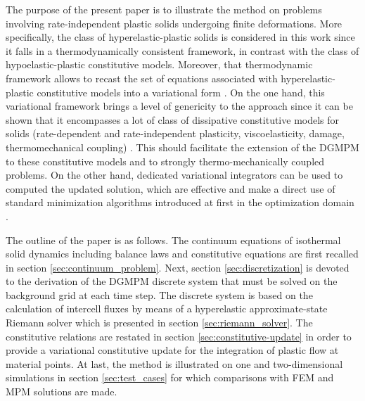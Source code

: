 The purpose of the present paper is to illustrate the method on problems involving rate-independent plastic solids undergoing finite deformations.
More specifically, the class of hyperelastic-plastic solids is considered in this work since it falls in a thermodynamically consistent framework, in contrast with the class of hypoelastic-plastic constitutive models. 
Moreover, that thermodynamic framework allows to recast the set of equations associated with hyperelastic-plastic constitutive models into a variational form \cite{Laurent99}.
On the one hand, this variational framework brings a level of genericity to the approach since it can be shown that it encompasses a lot of class of dissipative constitutive models for solids (rate-dependent and rate-independent plasticity, viscoelasticity, damage, thermomechanical coupling) \cite{Laurent99,Laurent2009,Laurent2008,Laurent2006,Laurent2010}.
This should facilitate the extension of the DGMPM to these constitutive models and to strongly thermo-mechanically coupled problems.
On the other hand, dedicated variational integrators can be used to computed the updated solution, which are effective and make a direct use of standard minimization algorithms introduced at first in the optimization domain \cite{Bertsekas}.
   

The outline of the paper is as follows.
The continuum equations of isothermal solid dynamics including balance laws and constitutive equations are first recalled in section \ref{sec:continuum_problem}.
Next, section \ref{sec:discretization} is devoted to the derivation of the DGMPM discrete system that must be solved on the background grid at each time step. 
The discrete system is based on the calculation of intercell fluxes by means of a hyperelastic approximate-state Riemann solver which is presented in section \ref{sec:riemann_solver}.
The constitutive relations are restated in section \ref{sec:constitutive-update} in order to provide a variational constitutive update for the integration of plastic flow at material points.
At last, the method is illustrated on one and two-dimensional simulations in section \ref{sec:test_cases} for which comparisons with FEM and MPM solutions are made.


